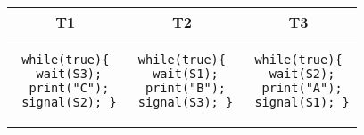 \begin{table}[H]
\centering
\begin{tabular}{|c|c|c|}
\hline
T1 & T2 & T3 \\
\hline
\begin{minipage}{0.28\linewidth}
\begin{verbatim}
while(true){
 wait(S3);
 print("C");
 signal(S2); }
\end{verbatim}
\end{minipage}
&
\begin{minipage}{0.28\linewidth}
\begin{verbatim}
while(true){
 wait(S1);
 print("B");
 signal(S3); }
\end{verbatim}
\end{minipage}
&
\begin{minipage}{0.28\linewidth}
\begin{verbatim}
while(true){
 wait(S2);
 print("A");
 signal(S1); }
\end{verbatim}
\end{minipage}
\\
\hline
\end{tabular}
\caption*{}
\label{tab:q19}
\end{table}